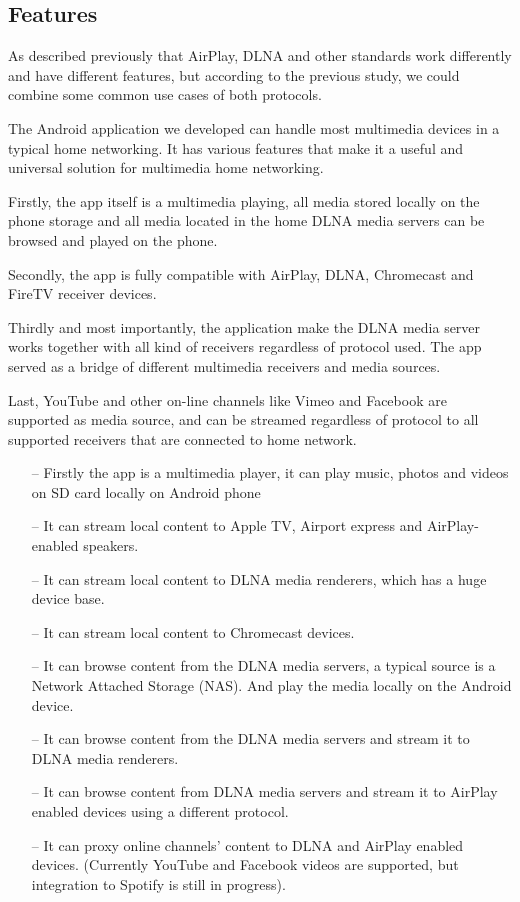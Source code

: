 \subsection{Features}
As described previously that AirPlay, DLNA and other standards work
differently and have different features, but according to the previous study,
we could combine some common use cases of both protocols.

The Android application we developed can handle most multimedia devices in 
a typical home networking. It has various features that make it a useful and
universal solution for multimedia home networking.

Firstly, the app itself is a multimedia playing, all media stored locally on the
phone storage and all media located in the home DLNA media servers can be
browsed and played on the phone.

Secondly, the app is fully compatible with AirPlay, DLNA, Chromecast and FireTV
receiver devices. 

Thirdly and most importantly, the application make the DLNA media server works
together with all kind of receivers regardless of protocol used. The app served
as a bridge of different multimedia receivers and media sources.

Last, YouTube and other on-line channels like Vimeo and Facebook are supported
as media source, and can be streamed regardless of protocol to all supported
receivers that are connected to home network.


\begin{itemize}
\item[--]Firstly the app is a multimedia player, it can play music, photos and videos 
on SD card locally on Android phone
\item[--]It can stream local content to Apple TV, Airport express and AirPlay-enabled 
speakers.
\item[--]It can stream local content to DLNA media renderers, which has a huge device 
base.
\item[--]It can stream local content to Chromecast devices.
\item[--]It can browse content from the DLNA media servers, a typical source is a 
Network Attached Storage (NAS). And play the media locally on the Android device.
\item[--]It can browse content from the DLNA media servers and stream it to DLNA media 
renderers.
\item[--]It can browse content from DLNA media servers and stream it to AirPlay enabled 
devices using a different protocol.
\item[--]It can proxy online channels' content to DLNA and AirPlay enabled devices. 
(Currently YouTube and Facebook videos are supported, but integration to Spotify is still 
in progress).
\end{itemize}


